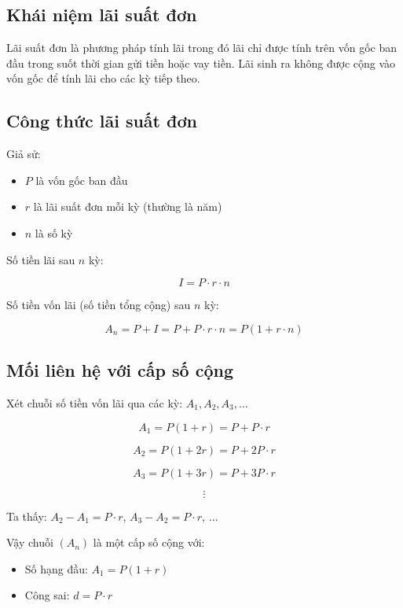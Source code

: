 \documentclass[12pt,a4paper]{report}
\begin{document}
\subsection{Khái niệm lãi suất đơn}

Lãi suất đơn là phương pháp tính lãi trong đó lãi chỉ được tính trên vốn gốc ban đầu trong suốt thời gian gửi tiền hoặc vay tiền. Lãi sinh ra không được cộng vào vốn gốc để tính lãi cho các kỳ tiếp theo.

\subsection{Công thức lãi suất đơn}

Giả sử:

\begin{itemize}[label=\textbullet]
    \item $P$ là vốn gốc ban đầu
    \item $r$ là lãi suất đơn mỗi kỳ (thường là năm)
    \item $n$ là số kỳ
\end{itemize}

Số tiền lãi sau $n$ kỳ:

\[
    I = P \cdot r \cdot n
\]

Số tiền vốn lãi (số tiền tổng cộng) sau $n$ kỳ:

\[
    A_n = P + I
    = P + P \cdot r \cdot n
    = P(1 + r \cdot n)
\]

\subsection{Mối liên hệ với cấp số cộng}

Xét chuỗi số tiền vốn lãi qua các kỳ:
$A_1, A_2, A_3, \dots$

\[
    A_1 = P(1 + r) = P + P \cdot r
\]

\[
    A_2 = P(1 + 2r) = P + 2P \cdot r
\]

\[
    A_3 = P(1 + 3r) = P + 3P \cdot r
\]

\[
    \vdots
\]

Ta thấy:
$A_2 - A_1 = P \cdot r$,
$A_3 - A_2 = P \cdot r$,
$\dots$

Vậy chuỗi $(A_n)$ là một cấp số cộng với:

\begin{itemize}[label=\textbullet]
    \item Số hạng đầu: $A_1 = P(1 + r)$
    \item Công sai: $d = P \cdot r$
\end{itemize}
\end{document}
